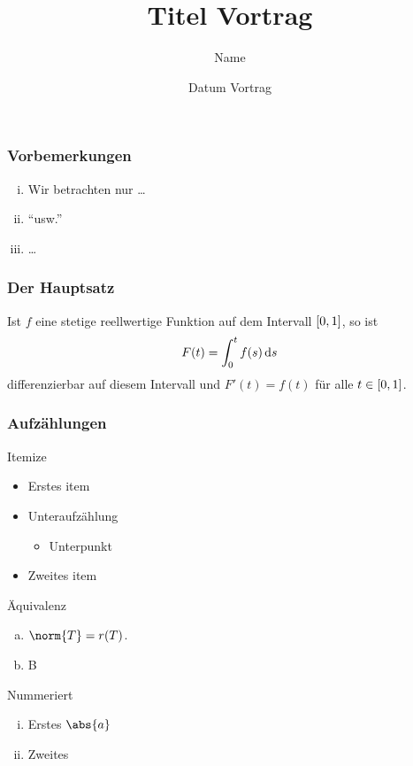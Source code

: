 \documentclass[%
	,ngerman
	,hyperref={%
		,bookmarks
		,colorlinks=true
		,citecolor=blue
		,linkcolor=blue
		,urlcolor=blue
			}
	,smaller
	]{beamer}
\begin{document}
%
\title{Titel Vortrag}
\author{Name}
\date{Datum Vortrag} 
\frame{\titlepage} %
\begin{frame} 		
	\frametitle{Vorbemerkungen}
	
	\begin{enumerate}[(i)]
		\item 
		Wir betrachten nur \ldots
		
		\item
		\enquote{usw.}
		
		\item
		\ldots
		
	\end{enumerate}
\end{frame}
\begin{frame}
	\frametitle{Der Hauptsatz}

\begin{theorem}\label{prop:hauptsatz}
%	
Ist $ f $ eine stetige reellwertige Funktion auf dem Intervall $ \left[ 0,1 \right] $, so ist
%
\[
  	F( t ) = \int_{ 0 }^{ t } f(s) \mathop{}\!\mathrm{d}{s}
\]
%
differenzierbar auf diesem Intervall und $ F'(t) = f(t) $ für alle $ t \in \left[ 0,1 \right] $.
\end{theorem}


\end{frame}
\begin{frame}[allowframebreaks]
	\frametitle{Aufzählungen}
%
\begin{block}{Itemize}
	\begin{itemize}

		\item 
		Erstes item
		
		\item
		Unteraufzählung
		
		\begin{itemize}
		
		\item
		Unterpunkt
		
		\end{itemize}
		
		\item
		Zweites item
		
	\end{itemize}
%
\end{block}	

\framebreak

\begin{block}{Äquivalenz}
	\begin{enumerate}[(a)]
		\item 
		$ \norm{ T } = r(T) $.
		
		\item
		B
	\end{enumerate}
\end{block}

\begin{block}{Nummeriert}
	\begin{enumerate}[(i)]
		\item 
		Erstes $ \abs{a} $
		
		\item
		Zweites
	\end{enumerate}
\end{block}
%
\end{frame}
\end{document}
